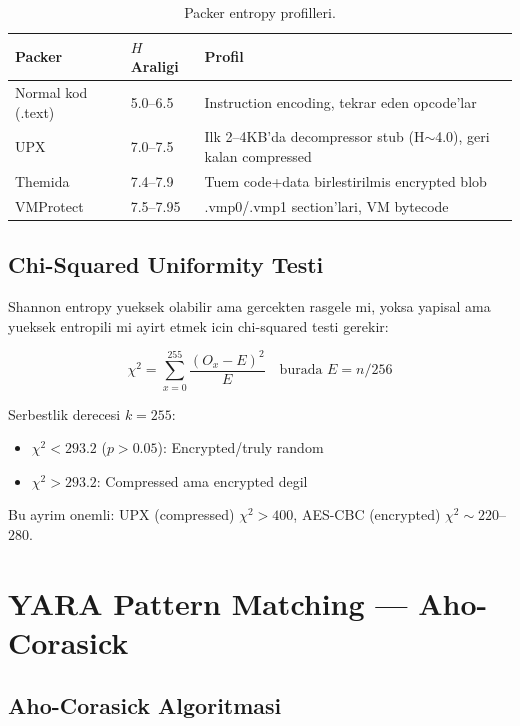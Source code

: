 \begin{table}[ht]
\centering
\begin{tabular}{llp{6cm}}
\toprule
\textbf{\color{sectioncyan}Packer} & \textbf{\color{sectioncyan}$H$ Arali\-gi} & \textbf{\color{sectioncyan}Profil} \\
\midrule
Normal kod (.text) & 5.0--6.5 & Instruction encoding, tekrar eden opcode'lar \\
UPX & 7.0--7.5 & Ilk 2--4KB'da decompressor stub (H$\sim$4.0), geri kalan compressed \\
Themida & 7.4--7.9 & Tuem code+data birlesti\-rilmis encrypted blob \\
VMProtect & 7.5--7.95 & .vmp0/.vmp1 section'lari, VM bytecode \\
\bottomrule
\end{tabular}
\caption{Packer entropy profilleri.}
\end{table}

\subsection{Chi-Squared Uniformity Testi}

\begin{tanim}
Shannon entropy yueksek olabilir ama gercekten rasgele mi, yoksa yapisal ama yueksek entropili mi ayirt etmek icin chi-squared testi gerekir:

\begin{equation}
\chi^2 = \sum_{x=0}^{255} \frac{(O_x - E)^2}{E} \quad \text{burada } E = n/256
\end{equation}

Serbestlik derecesi $k = 255$:
\begin{itemize}
\item $\chi^2 < 293.2$ ($p > 0.05$): Encrypted/truly random
\item $\chi^2 > 293.2$: Compressed ama encrypted degil
\end{itemize}

Bu ayrim onemli: UPX (compressed) $\chi^2 > 400$, AES-CBC (encrypted) $\chi^2 \sim 220$--$280$.
\end{tanim}


\section{YARA Pattern Matching --- Aho-Corasick}
\label{sec:yara-deep}

\subsection{Aho-Corasick Algoritmasi}


